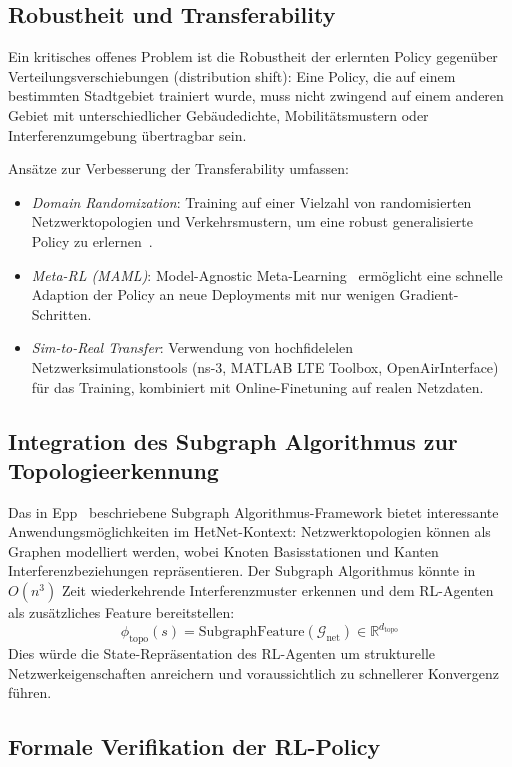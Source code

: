 ﻿\documentclass[a4paper,12pt]{article}
\theoremstyle{definition}
\begin{document}
\subsection{Robustheit und Transferability}

Ein kritisches offenes Problem ist die Robustheit der erlernten Policy gegen\"uber
Verteilungsverschiebungen (distribution shift): Eine Policy, die auf einem bestimmten
Stadtgebiet trainiert wurde, muss nicht zwingend auf einem anderen Gebiet mit
unterschiedlicher Geb\"audedichte, Mobilitätsmustern oder Interferenzumgebung
\"ubertragbar sein.

Ans\"atze zur Verbesserung der Transferability umfassen:
\begin{itemize}
  \item \emph{Domain Randomization}: Training auf einer Vielzahl von randomisierten
    Netzwerktopologien und Verkehrsmustern, um eine robust generalisierte Policy zu erlernen~\cite{tobin2017}.
  \item \emph{Meta-RL (MAML)}: Model-Agnostic Meta-Learning~\cite{finn2017} erm\"oglicht
    eine schnelle Adaption der Policy an neue Deployments mit nur wenigen Gradient-Schritten.
  \item \emph{Sim-to-Real Transfer}: Verwendung von hochfidelelen Netzwerksimulationstools
    (ns-3, MATLAB LTE Toolbox, OpenAirInterface) f\"ur das Training, kombiniert mit
    Online-Finetuning auf realen Netzdaten.
\end{itemize}

\subsection{Integration des Subgraph Algorithmus zur Topologieerkennung}

Das in Epp~\cite{epp2026sub} beschriebene Subgraph Algorithmus-Framework bietet
interessante Anwendungsm\"oglichkeiten im HetNet-Kontext: Netzwerktopologien k\"onnen
als Graphen modelliert werden, wobei Knoten Basisstationen und Kanten Interferenzbeziehungen
repr\"asentieren. Der Subgraph Algorithmus k\"onnte in $O(n^3)$ Zeit wiederkehrende
Interferenzmuster erkennen und dem RL-Agenten als zus\"atzliches Feature bereitstellen:
\[
  \phi_{\mathrm{topo}}(s) = \mathrm{SubgraphFeature}(\mathcal{G}_{\mathrm{net}})
  \in \mathbb{R}^{d_{\mathrm{topo}}}
\]
Dies w\"urde die State-Repr\"asentation des RL-Agenten um strukturelle Netzwerkeigenschaften
anreichern und voraussichtlich zu schnellerer Konvergenz f\"uhren.

\subsection{Formale Verifikation der RL-Policy}
\end{document}
